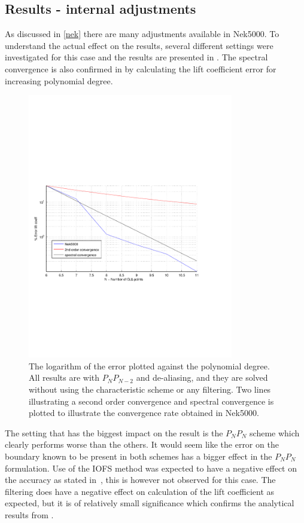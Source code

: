 \subsection{Results - internal adjustments }
As discussed in \cref{nek} there are many adjustments available in Nek5000. 
To understand the actual effect on the results, several different settings were 
investigated for this case and the results are presented in . 
The spectral convergence is also confirmed in  by calculating the 
lift coefficient error for increasing polynomial degree. 
%
\begin{figure}[h]
	\centerline{
        \includegraphics[trim=0.5cm 7cm 0.5cm 7cm, width=0.8\textwidth]{Figures/lift_coef4.pdf}}
	\caption{The logarithm of the error plotted against the polynomial degree. All results 
        are with $P_NP_{N-2}$ and de-aliasing, and they are solved without using the 
    characteristic scheme or any filtering. Two lines illustrating a second order convergence and spectral convergence 
    is plotted to illustrate the convergence rate obtained in Nek5000.}
	\label{fig:liftconv}
\end{figure}
%

The setting that has the biggest impact on the result is the $P_NP_N$ scheme which clearly performs 
worse than the others. It would seem like the error on the boundary known to be present in both schemes
has a bigger effect in the $P_NP_N$ formulation.
Use of the IOFS method was expected to have a negative effect on the accuracy as stated in~\cite{Deville}, 
this is however not observed for this case.
The filtering does have a negative effect on calculation of the lift coefficient as expected,
but it is of relatively small significance which confirms the analytical results from . 

